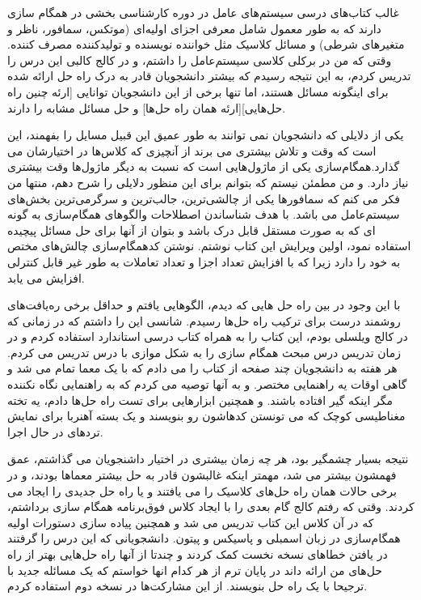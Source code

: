 \documentclass{book}
\begin{document}
غالب کتاب‌های درسی سیستم‌های عامل در دوره کارشناسی بخشی در همگام سازی دارند که به طور معمول شامل معرفی اجزای اولیه‌ای (موتکس، سمافور، ناظر و متغیر‌های شرطی) و مسائل کلاسیک مثل خواننده نویسنده و تولیدکننده مصرف کننده.
وقتی که من در برکلی کلاسی سیستم‌عامل را داشتم، و در کالج کالبی این درس را تدریس کردم، به این نتیجه رسیدم که بیشتر دانشجویان قادر به درک راه حل ارائه شده برای اینگونه مسائل هستند، اما تنها برخی از این دانشجویان توانایی [ارئه چنین راه حل‌هایی][ارئه همان راه حل‌ها] و  حل مسائل مشابه را دارند.

یکی از دلایلی که دانشجویان نمی توانند به طور عمیق این قبیل مسایل را بفهمند، این است که وقت و تلاش بیشتری می برند از آنچیزی که کلاس‌ها در اختیارشان می گذارد.همگام‌سازی یکی از ماژول‌هایی است که نسبت به دیگر ماژول‌ها وقت بیشتری نیاز دارد. و من مطمئن نیستم که بتوانم برای این منظور دلایلی را شرح دهم، منتها من فکر می کنم که سمافور‌ها یکی از چالشی‌ترین، جالب‌ترین و سرگرمی‌ترین بخش‌های سیستم‌عامل می باشد.
با هدف شناساندن  اصطلاحات والگوهای همگام‌سازی به گونه ای که به صورت مستقل قابل درک باشد و بتوان از آنها برای حل مسائل پیچیده استفاده نمود، اولین ویرایش این کتاب نوشتم.
نوشتن کدهمگام‌سازی چالش‌های مختص به خود را دارد زیرا که با افزایش تعداد اجزا و تعداد تعاملات به طور غیر قابل کنترلی افزایش می یابد.


با این وجود در بین راه حل هایی که دیدم، الگوهایی یافتم و حداقل برخی  ره‌یافت‌های روشمند درست برای ترکیب راه حل‌ها رسیدم.
شانسی این را داشتم که در زمانی که در کالج ویلسلی بودم، این کتاب را به همراه کتاب درسی استاندارد استفاده کردم و در زمان تدریس درس مبحث همگام سازی را به شکل موازی با درس تدریس می کردم. هر هفته به دانشجویان چند صفحه از کتاب را می دادم که با یک معما تمام می شد و گاهی اوقات یه راهنمایی مختصر. و به آنها توصیه می کردم که به راهنمایی نگاه نکننده مگر اینکه گیر افتاده باشند.
و همچنین ابزارهایی برای تست راه حل‌ها دادم، یه تخته مغناطیسی کوچک که می تونستن کدهاشون رو بنویسند و یک بسته آهنربا برای نمایش تردهای در حال اجرا.

نتیجه بسیار چشمگیر بود، هر چه زمان بیشتری در اختیار داشنجویان می گذاشتم، عمق فهمشون بیشتر می شد، مهمتر اینکه غالبشون قادر به حل بیشتر معماها بودند، و در برخی حالات همان راه حل‌های کلاسیک را می یافتند و یا راه حل جدیدی را ایجاد می کردند.
وقتی که رفتم کالج گام بعدی را با ایجاد کلاس فوق‌برنامه همگام سازی برداشتم، که در آن کلاس این کتاب تدریس می شد و همچنین پیاده سازی دستورات اولیه همگام‌سازی در زبان اسمبلی  و پاسیکس و پیتون.
دانشجویانی که این درس را گرفتند در یافتن خطاهای نسخه نخست کمک کردند و چندتا از آنها راه حل‌هایی بهتر از راه حل‌های من ارائه داند در پایان ترم از هر کدام انها خواستم که یک مسائله جدید با ترجیحا با یک راه حل بنویسند. از این مشارکت‌ها در نسخه دوم استفاده کردم.
\end{document}
